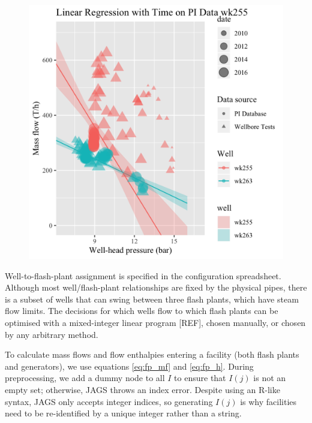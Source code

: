 \documentclass[a4paper, 12pt]{article}
\begin{document}
\begin{figure}
\begin{minipage}[t]{.48\textwidth}
  \includegraphics[width=\linewidth]{media/production_curve}
  \label{fig:production_curve}
\end{minipage}
\end{figure}

Well-to-flash-plant assignment is specified in the configuration spreadsheet. Although most well/flash-plant relationships are fixed by the physical pipes, there is a subset of wells that can swing between three flash plants, which have steam flow limits. The decisions for which wells flow to which flash plants can be optimised with a mixed-integer linear program [REF], chosen manually, or chosen by any arbitrary method.

To calculate mass flows and flow enthalpies entering a facility (both flash plants and generators), we use equations \ref{eq:fp_mf} and \ref{eq:fp_h}. During preprocessing, we add a dummy node to all $I$ to ensure that $I(j)$ is not an empty set; otherwise, JAGS throws an index error. Despite using an R-like syntax, JAGS only accepts integer indices, so generating $I(j)$ is why facilities need to be re-identified by a unique integer rather than a string. 
\end{document}
